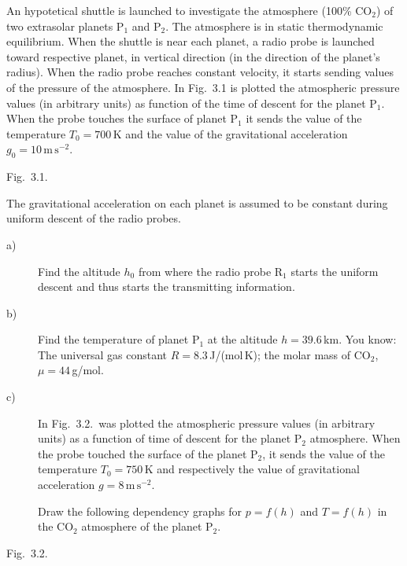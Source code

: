 An hypotetical shuttle is launched to investigate the atmosphere (100\%
CO$_2$) of two extrasolar planets P$_1$ and P$_2$. The atmosphere is in
static thermodynamic equilibrium. When the shuttle is near each planet, a
radio probe is launched toward respective planet, in vertical direction (in
the direction of the planet's radius). When the radio probe reaches constant
velocity, it starts sending values of the pressure of the atmosphere. In
Fig.~3.1 is plotted the atmospheric pressure values (in arbitrary units) as
function of the time of descent for the planet P$_1$. When the probe touches
the surface of planet P$_1$ it sends the value of the temperature
$T_0 = 700$\,K and the value of the gravitational acceleration
$g_0 = 10\,\mathrm{m\,s}^{-2}$.

\begin{center}
Fig.~3.1.
\end{center}

The gravitational acceleration on each planet is assumed to be constant
during uniform descent of the radio probes.

\begin{description}
\item[a)] Find the altitude $h_0$ from where the radio probe R$_1$ starts the
  uniform descent and thus starts the transmitting information.
\item[b)] Find the temperature of planet P$_1$ at the altitude
  $h = 39.6$\,km. You know: The universal gas constant
  $R = 8.3$\,J/(mol\,K); the molar mass of CO$_2$, $\mu = 44$\,g/mol.
\item[c)] In Fig.~3.2.\ was plotted the atmospheric pressure values (in
  arbitrary units) as a function of time of descent for the planet P$_2$
  atmosphere. When the probe touched the surface of the planet P$_2$, it
  sends the value of the temperature $T_0 = 750$\,K and respectively the
  value of gravitational acceleration $g = 8\,\mathrm{m\,s}^{-2}$.

  Draw the following dependency graphs for $p = f(h)$ and $T = f(h)$ in the
  CO$_2$ atmosphere of the planet P$_2$.
\end{description}

\begin{center}
Fig.~3.2.
\end{center}

